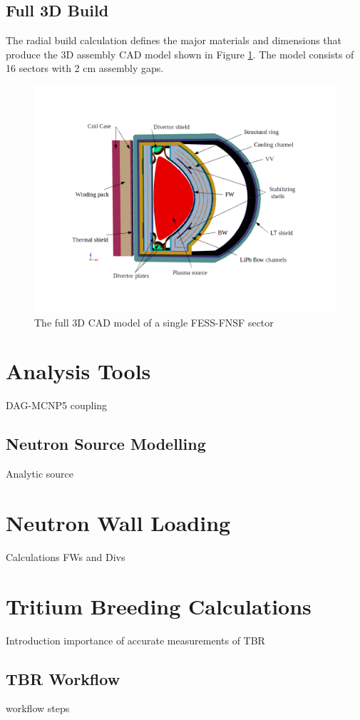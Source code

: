 \documentclass[12pt, letterpaper]{elsarticle}
\begin{document}
\subsection{Full 3D Build}
The radial build calculation defines the major materials and dimensions that produce the 3D assembly CAD model shown in Figure \ref{fig:Full3D}. The model consists of 16 sectors with 2 cm assembly gaps. 
\begin{figure}[h!]
  \centering
  \includegraphics[scale=0.3]{../plots/full_3d.png}
  \caption{The full 3D CAD model of a single FESS-FNSF sector}
  \label{fig:Full3D}
\end{figure}

\section{Analysis Tools}
DAG-MCNP5 coupling
\subsection{Neutron Source Modelling}
Analytic source

\section{Neutron Wall Loading}
Calculations FWs and Divs

\section{Tritium Breeding Calculations}
Introduction
importance of accurate measurements of TBR
\subsection{TBR Workflow}
workflow steps
\end{document}
